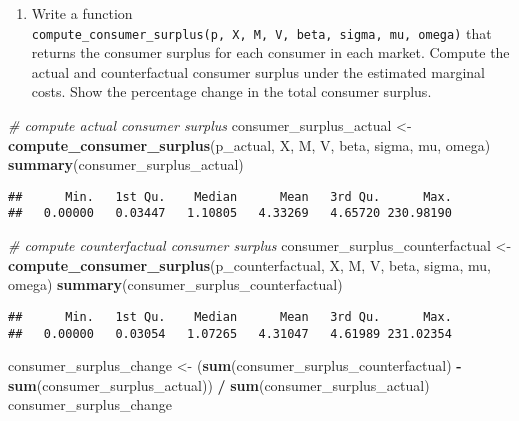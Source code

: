 \documentclass[
]{book}
\newenvironment{Shaded}{\begin{snugshade}}{\end{snugshade}}
\newcommand{\CommentTok}[1]{\textcolor[rgb]{0.56,0.35,0.01}{\textit{#1}}}
\newcommand{\KeywordTok}[1]{\textcolor[rgb]{0.13,0.29,0.53}{\textbf{#1}}}
\newcommand{\NormalTok}[1]{#1}
\newcommand{\OperatorTok}[1]{\textcolor[rgb]{0.81,0.36,0.00}{\textbf{#1}}}
\newcommand{\StringTok}[1]{\textcolor[rgb]{0.31,0.60,0.02}{#1}}
\providecommand{\tightlist}{%
  \setlength{\itemsep}{0pt}\setlength{\parskip}{0pt}}
\begin{document}
\begin{enumerate}
\def\labelenumi{\arabic{enumi}.}
\setcounter{enumi}{3}
\tightlist
\item
  Write a function \texttt{compute\_consumer\_surplus(p,\ X,\ M,\ V,\ beta,\ sigma,\ mu,\ omega)} that returns the consumer surplus for each consumer in each market. Compute the actual and counterfactual consumer surplus under the estimated marginal costs. Show the percentage change in the total consumer surplus.
\end{enumerate}

\begin{Shaded}
\begin{Highlighting}[]
\CommentTok{# compute actual consumer surplus}
\NormalTok{consumer_surplus_actual <-}\StringTok{ }
\StringTok{  }\KeywordTok{compute_consumer_surplus}\NormalTok{(p_actual, X, M, V, beta, sigma, mu, omega)}
\KeywordTok{summary}\NormalTok{(consumer_surplus_actual)}
\end{Highlighting}
\end{Shaded}

\begin{verbatim}
##      Min.   1st Qu.    Median      Mean   3rd Qu.      Max. 
##   0.00000   0.03447   1.10805   4.33269   4.65720 230.98190
\end{verbatim}

\begin{Shaded}
\begin{Highlighting}[]
\CommentTok{# compute counterfactual consumer surplus}
\NormalTok{consumer_surplus_counterfactual <-}\StringTok{ }
\StringTok{  }\KeywordTok{compute_consumer_surplus}\NormalTok{(p_counterfactual, X, M, V, beta, sigma, mu, omega)}
\KeywordTok{summary}\NormalTok{(consumer_surplus_counterfactual)}
\end{Highlighting}
\end{Shaded}

\begin{verbatim}
##      Min.   1st Qu.    Median      Mean   3rd Qu.      Max. 
##   0.00000   0.03054   1.07265   4.31047   4.61989 231.02354
\end{verbatim}

\begin{Shaded}
\begin{Highlighting}[]
\NormalTok{consumer_surplus_change <-}\StringTok{ }
\StringTok{  }\NormalTok{(}\KeywordTok{sum}\NormalTok{(consumer_surplus_counterfactual) }\OperatorTok{-}\StringTok{ }
\StringTok{     }\KeywordTok{sum}\NormalTok{(consumer_surplus_actual)) }\OperatorTok{/}
\StringTok{  }\KeywordTok{sum}\NormalTok{(consumer_surplus_actual)}
\NormalTok{consumer_surplus_change}
\end{Highlighting}
\end{Shaded}
\end{document}
